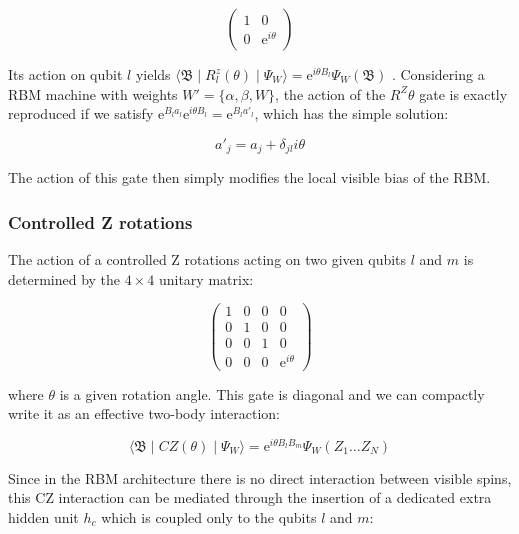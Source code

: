 \begin{equation}
    \begin{pmatrix}
        1 & 0 \\
        0 & \mathrm{e}^{i\theta}
    \end{pmatrix}
\end{equation}

Its action on qubit $l$ yields 
$\langle \mathfrak{B} \mid R_{l}^{z}(\theta) \mid \Psi_{W}  \rangle = 
\mathrm{e}^{i\theta B_{l}} \Psi_{W}(\mathfrak{B})
$
. Considering a RBM machine with weights $W\prime = \{\alpha,\beta,W\}$, the action of the $R^{Z}{\theta}$
gate is exactly reproduced if we satisfy $\mathrm{e}^{B_{l}a_{l}}\mathrm{e}^{i\theta B_{l}} = \mathrm{e}^{B_{l}a\prime_{l}}$,
which has the simple solution:

\begin{equation}
    a\prime_{j} = a_{j} + \delta_{jl}i\theta
\end{equation}

The action of this gate then simply modifies the local visible bias of the RBM.

\subsubsection{Controlled Z rotations}
The action of a controlled Z rotations acting on two given qubits $l$ and $m$ is determined by
the $4\times4$ unitary matrix:

\begin{equation}
    \begin{pmatrix}
        1 & 0 & 0 & 0 \\
        0 & 1 & 0 & 0 \\
        0 & 0 & 1 & 0 \\
        0 & 0 & 0 & \mathrm{e}^{i\theta}
    \end{pmatrix}
\end{equation}

where $\theta$ is a given rotation angle. This gate is diagonal and we can compactly write it as an 
effective two-body interaction:

\begin{equation}
    \langle \mathfrak{B} \mid CZ(\theta) \mid \Psi_{W}  \rangle = 
    \mathrm{e}^{i\theta B_{l}B_{m}}\Psi_{W}(Z_{1} \dots Z_{N})
\end{equation}

Since in the RBM architecture there is no direct interaction between visible spins, this CZ interaction
can be mediated through the insertion of a dedicated extra hidden unit $h_{c}$ which is coupled only 
to the qubits $l$ and $m$: 

